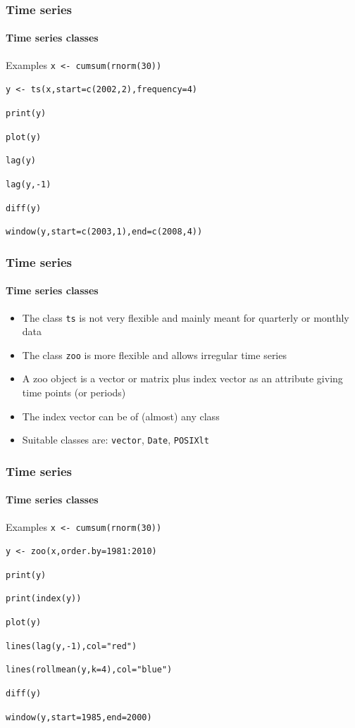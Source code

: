 \documentclass[title={Introduction to R}, author={Mutschler and Zaharieva}, inst={Institute for Econometrics and Empirical Economics}]{beamer}
\begin{document}
\begin{frame}
	\frametitle{Time series}	
	\framesubtitle{Time series classes}	
	\begin{block}{Examples}
		\texttt{x <- cumsum(rnorm(30))}	
		
		\texttt{y <- ts(x,start=c(2002,2),frequency=4)}
		
		\texttt{print(y)}
		
		\texttt{plot(y)}
		
		\texttt{lag(y)}
		
		\texttt{lag(y,-1)}
		
		\texttt{diff(y)}
		
		\texttt{window(y,start=c(2003,1),end=c(2008,4))}
	\end{block}	
\end{frame}


\begin{frame}
	\frametitle{Time series}	
	\framesubtitle{Time series classes}	
	\begin{itemize}
		\item The class \texttt{ts} is not very flexible and mainly meant for
		quarterly or monthly data		
		\item The class \texttt{zoo} is more flexible and allows irregular time
		series		
		\item A zoo object is a vector or matrix plus index vector as an attribute
		giving time points (or periods)		
		\item The index vector can be of (almost) any class		
		\item Suitable classes are: \texttt{vector}, \texttt{Date}, \texttt{POSIXlt}
	\end{itemize}
\end{frame}


\begin{frame}
	\frametitle{Time series}	
	\framesubtitle{Time series classes}	
	\begin{block}{Examples}
		\texttt{x <- cumsum(rnorm(30))}
			
		\texttt{y <- zoo(x,order.by=1981:2010)}
		
		\texttt{print(y)}
		
		\texttt{print(index(y))}
		
		\texttt{plot(y)}
		
		\texttt{lines(lag(y,-1),col="red")}
		
		\texttt{lines(rollmean(y,k=4),col="blue")}
		
		\texttt{diff(y)}
		
		\texttt{window(y,start=1985,end=2000)}
	\end{block}
\end{frame}
\end{document}
